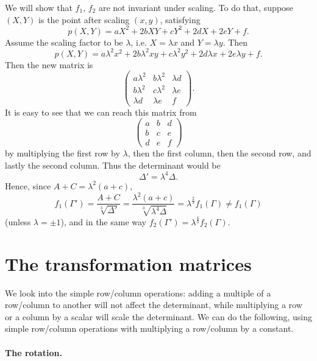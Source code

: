 We will show that $f_1$, $f_2$ are not invariant under scaling. To do that, suppose $(X,Y)$ is the point after scaling $(x,y)$, satisfying
\[
p(X,Y) = aX^2 + 2bXY + cY^2 + 2dX + 2eY + f .
\]
Assume the scaling factor to be $\lambda$, i.e. $X = \lambda x$ and $Y = \lambda y$. Then
\[
p(X,Y) = a\lambda^2 x^2 + 2b\lambda^2 xy + c\lambda^2 y^2 + 2d\lambda x + 2e\lambda y + f .
\]
Then the new matrix is
\[
\begin{pmatrix} a\lambda^2 & b\lambda^2 & \lambda d \\ b\lambda^2 & c\lambda^2 & \lambda e \\ \lambda d & \lambda e & f \end{pmatrix}.
\]
It is easy to see that we can reach this matrix from
\[
\begin{pmatrix} a & b & d \\ b & c & e \\ d & e & f \end{pmatrix}
\]
by multiplying the first row by $\lambda$, then the first column, then the second row, and lastly the second column. Thus the determinant would be
\[
\Delta' = \lambda^4 \Delta .
\]
Hence, since $A + C = \lambda^2 (a + c)$,
\[
f_1(\Gamma') = \frac{A + C}{\sqrt[3]{\Delta'}} = \frac{\lambda^2 (a + c)}{\sqrt[3]{\lambda^4 \Delta}} = \lambda^{\frac23} f_1(\Gamma) \neq f_1(\Gamma)
\]
(unless $\lambda = \pm 1$), and in the same way $f_2(\Gamma') = \lambda^{\frac43} f_2(\Gamma)$.

\section{The transformation matrices}

We look into the simple row/column operations: adding a multiple of a row/column to another will not affect the determinant, while multiplying a row or a column by a scalar will scale the determinant. We can do the following, using simple row/column operations with multiplying a row/column by a constant.

\paragraph{The rotation.}

